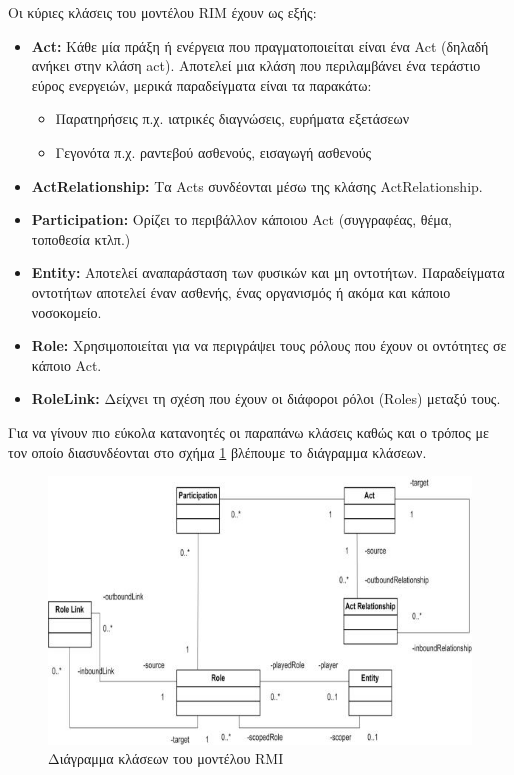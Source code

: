 	Οι κύριες κλάσεις του μοντέλου RIM έχουν ως εξής\cite{gunther2006hl7}:
	\begin{itemize}
		\item \textbf{Act: } Κάθε μία πράξη ή ενέργεια που πραγματοποιείται είναι ένα Act (δηλαδή ανήκει στην κλάση act). Αποτελεί μια κλάση που περιλαμβάνει ένα τεράστιο εύρος ενεργειών, μερικά παραδείγματα είναι τα παρακάτω:
		\begin{itemize}
			\item Παρατηρήσεις π.χ. ιατρικές διαγνώσεις, ευρήματα εξετάσεων
			\item Γεγονότα π.χ. ραντεβού ασθενούς, εισαγωγή ασθενούς 
		\end{itemize}
		\item \textbf{ActRelationship: } Τα Acts συνδέονται μέσω της κλάσης ActRelationship.
		\item \textbf{Participation: } Ορίζει το περιβάλλον κάποιου Act (συγγραφέας, θέμα, τοποθεσία κτλπ.)
		\item \textbf{Entity: } Αποτελεί αναπαράσταση των φυσικών και μη οντοτήτων. Παραδείγματα οντοτήτων αποτελεί έναν ασθενής, ένας οργανισμός ή ακόμα και κάποιο νοσοκομείο.
		\item \textbf{Role: } Χρησιμοποιείται για να περιγράψει τους ρόλους που έχουν οι οντότητες σε κάποιο Act.
		\item \textbf{RoleLink: } Δείχνει τη σχέση που έχουν οι διάφοροι ρόλοι (Roles) μεταξύ τους.
	\end{itemize}
	Για να γίνουν πιο εύκολα κατανοητές οι παραπάνω κλάσεις καθώς και ο τρόπος με τον οποίο διασυνδέονται στο σχήμα \ref{fig:RMI_class_model} βλέπουμε το διάγραμμα κλάσεων\cite{gunther2006hl7}.
	\begin{figure}[h]
	    \centering
	    \includegraphics[width=1\textwidth]{RMI_class_model.jpg}
	    \caption{Διάγραμμα κλάσεων του μοντέλου RMI}
	    \label{fig:RMI_class_model}
	\end{figure}		
		

